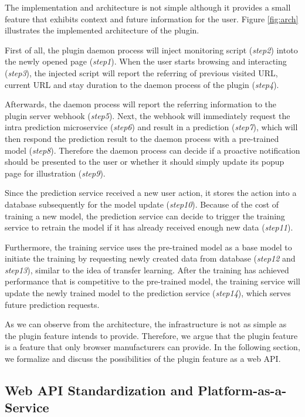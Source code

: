 The implementation and architecture is not simple
although it provides a small feature that exhibits context and future information for the user.
Figure \ref{fig:arch} illustrates the implemented architecture of the plugin.

First of all, the plugin daemon process will inject monitoring script (\emph{step2}) intoto 
the newly opened page (\emph{step1}).
When the user starts browsing and interacting (\emph{step3}), the injected script will report the referring of
previous visited URL, current URL and stay duration to the daemon process of the plugin (\emph{step4}).

Afterwards, the daemon process will report the referring information to the plugin server webhook (\emph{step5}).
Next, the webhook will immediately request the intra prediction microservice (\emph{step6}) and result in a 
prediction (\emph{step7}), which will then respond the prediction result to the daemon process 
with a pre-trained model (\emph{step8}). Therefore the daemon process can decide 
if a proactive notification should be presented to the user or whether it should simply update its popup page
for illustration (\emph{step9}).

Since the prediction service received a new user action, it stores the action into a database
subsequently for the model update (\emph{step10}). Because of the cost of training a new model,
the prediction service can decide to trigger the training service to retrain the model 
if it has already received enough new data (\emph{step11}).

Furthermore, the training service uses the pre-trained model as
a base model to initiate the training by requesting newly created data from database (\emph{step12} and \emph{step13}), 
similar to the idea of transfer learning.
After the training has achieved performance that is competitive to the pre-trained model,
the training service will update the newly trained model to the prediction service (\emph{step14}), which 
serves future prediction requests.

As we can observe from the architecture, the infrastructure is not as simple as 
the plugin feature intends to provide. Therefore, we argue that the plugin feature is a feature that
only browser manufacturers can provide. In the following section, we formalize and discuss 
the possibilities of the plugin feature as a web API.

\subsection{Web API Standardization and Platform-as-a-Service}

